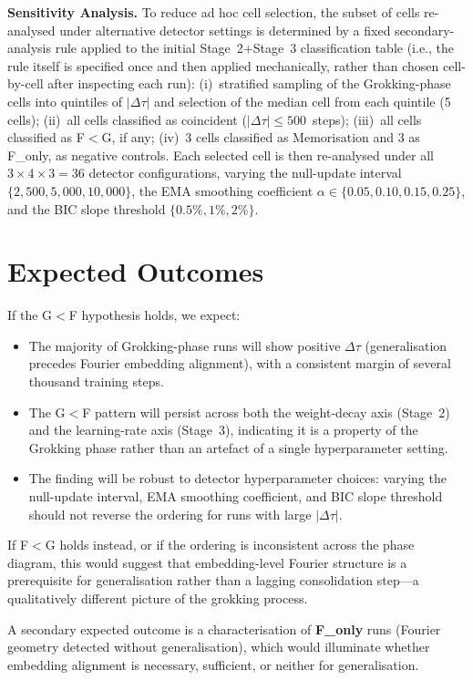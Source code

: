 \documentclass[12pt,openany,oneside,a4paper]{book}
\newcommand{\Dtau}{\Delta\tau}
\begin{document}
\textbf{Sensitivity Analysis.}
To reduce ad hoc cell selection, the subset of cells re-analysed
under alternative detector settings is determined by a fixed
secondary-analysis rule applied to the initial Stage~2$+$Stage~3
classification table (i.e., the rule itself is specified once and
then applied mechanically, rather than chosen cell-by-cell after
inspecting each run):
(i)~stratified sampling of the Grokking-phase cells into quintiles of
$|\Dtau|$ and selection of the median cell from each quintile
(5 cells);
(ii)~all cells classified as coincident ($|\Dtau|\leq 500$~steps);
(iii)~all cells classified as F$<$G, if any;
(iv)~3 cells classified as Memorisation and 3 as F\_only, as
negative controls.
Each selected cell is then re-analysed under all
$3\times4\times3 = 36$ detector configurations, varying the
null-update interval $\{2{,}500, 5{,}000, 10{,}000\}$, the EMA
smoothing coefficient $\alpha\in\{0.05, 0.10, 0.15, 0.25\}$, and
the BIC slope threshold $\{0.5\%, 1\%, 2\%\}$.

\section{Expected Outcomes}

If the G$<$F hypothesis holds, we expect:
\begin{itemize}
  \item The majority of Grokking-phase runs will show positive $\Dtau$
    (generalisation precedes Fourier embedding alignment), with a
    consistent margin of several thousand training steps.
  \item The G$<$F pattern will persist across both the weight-decay axis
    (Stage~2) and the learning-rate axis (Stage~3), indicating it is a
    property of the Grokking phase rather than an artefact of a single
    hyperparameter setting.
  \item The finding will be robust to detector hyperparameter choices:
    varying the null-update interval, EMA smoothing coefficient, and BIC
    slope threshold should not reverse the ordering for runs with large
    $|\Dtau|$.
\end{itemize}

If F$<$G holds instead, or if the ordering is inconsistent across the
phase diagram, this would suggest that embedding-level Fourier structure
is a prerequisite for generalisation rather than a lagging consolidation
step---a qualitatively different picture of the grokking process.

A secondary expected outcome is a characterisation of \textbf{F\_only}
runs (Fourier geometry detected without generalisation), which would
illuminate whether embedding alignment is necessary, sufficient, or
neither for generalisation.
\end{document}
